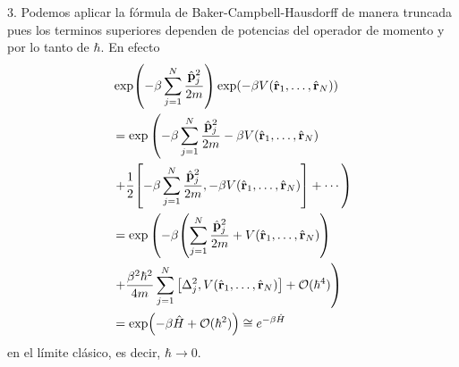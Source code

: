 \documentclass{article}
\begin{document}
3. Podemos aplicar la fórmula de Baker-Campbell-Hausdorff de manera truncada pues los terminos superiores dependen de potencias del operador de momento y por lo tanto de $\hbar$. En efecto
\begin{align}
\begin{split}
&\exp(-\beta\sum_{j=1}^N\frac{\hat{\vb{p}}_j^2}{2m})\exp(-\beta V(\hat{\vb{r}}_1,\dots,\hat{\vb{r}}_N))\\
&=\exp \left(-\beta\sum_{j=1}^N\frac{\hat{\vb{p}}_j^2}{2m}-\beta V(\hat{\vb{r}}_1,\dots,\hat{\vb{r}}_N)\right.\\
&\left.+\frac{1}{2}\qty[-\beta\sum_{j=1}^N\frac{\hat{\vb{p}}_j^2}{2m},-\beta V(\hat{\vb{r}}_1,\dots,\hat{\vb{r}}_N)]+\cdots\right)\\
&=\exp \left(-\beta\qty(\sum_{j=1}^N\frac{\hat{\vb{p}}_j^2}{2m}+ V(\hat{\vb{r}}_1,\dots,\hat{\vb{r}}_N)) \right.\\
&\left.+\frac{\beta^2\hbar^2}{4m}\sum_{j=1}^N\qty[\Delta_j^2, V(\hat{\vb{r}}_1,\dots,\hat{\vb{r}}_N)]+\mathcal{O}(\hbar^4)\right)\\
&=\exp(-\beta\hat{H}+\mathcal{O}(\hbar^2))\cong e^{-\beta\hat{H}}\\
\end{split}
\end{align}
en el límite clásico, es decir, $\hbar\rightarrow 0
$.
\end{document}
